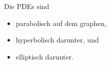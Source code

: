 \begin{solution}
\begin{enumerate}[label = (\roman*)]
\end{enumerate}

Die PDEs sind

\begin{itemize}
    \item parabolisch auf dem graphen,
    \item hyperbolisch darunter, und
    \item elliptisch darunter.
\end{itemize}

\end{solution}


